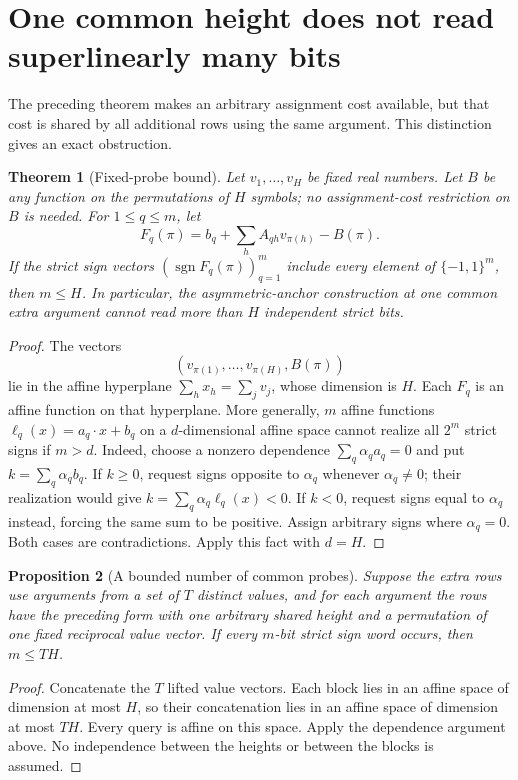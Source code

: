\documentclass[11pt]{article}
\newtheorem{theorem}{Theorem}
\newtheorem{proposition}[theorem]{Proposition}
\begin{document}
\section{One common height does not read superlinearly many bits}

The preceding theorem makes an arbitrary assignment cost available,
but that cost is shared by all additional rows using the same argument.
This distinction gives an exact obstruction.

\begin{theorem}[Fixed-probe bound]
Let $v_1,\ldots,v_H$ be fixed real numbers. Let $B$ be any function
on the permutations of $H$ symbols; no assignment-cost restriction
on $B$ is needed. For $1\leq q\leq m$, let
\[
 F_q(\pi)=b_q+\sum_h A_{qh}v_{\pi(h)}-B(\pi).
\]
If the strict sign vectors $(\operatorname{sgn}F_q(\pi))_{q=1}^m$
include every element of $\{-1,1\}^m$, then $m\leq H$.
In particular, the asymmetric-anchor construction at one common
extra argument cannot read more than $H$ independent strict bits.
\end{theorem}

\begin{proof}
The vectors
\[
 (v_{\pi(1)},\ldots,v_{\pi(H)},B(\pi))
\]
lie in the affine hyperplane $\sum_hx_h=\sum_jv_j$, whose dimension
is $H$. Each $F_q$ is an affine function on that hyperplane.
More generally, $m$ affine functions $\ell_q(x)=a_q\cdot x+b_q$
on a $d$-dimensional affine space cannot realize all $2^m$ strict
signs if $m>d$. Indeed, choose a nonzero dependence
$\sum_q\alpha_q a_q=0$ and put $k=\sum_q\alpha_q b_q$.
If $k\geq0$, request signs opposite to $\alpha_q$ whenever
$\alpha_q\ne0$; their realization would give
$k=\sum_q\alpha_q\ell_q(x)<0$. If $k<0$, request signs equal to
$\alpha_q$ instead, forcing the same sum to be positive. Assign
arbitrary signs where $\alpha_q=0$. Both cases are contradictions.
Apply this fact with $d=H$.
\end{proof}

\begin{proposition}[A bounded number of common probes]
Suppose the extra rows use arguments from a set of $T$ distinct
values, and for each argument the rows have the preceding form with
one arbitrary shared height and a permutation of one fixed reciprocal
value vector. If every $m$-bit strict sign word occurs, then
$m\leq TH$.
\end{proposition}

\begin{proof}
Concatenate the $T$ lifted value vectors. Each block lies in an affine
space of dimension at most $H$, so their concatenation lies in an
affine space of dimension at most $TH$. Every query is affine on
this space. Apply the dependence argument above. No independence
between the heights or between the blocks is assumed.
\end{proof}
\end{document}
